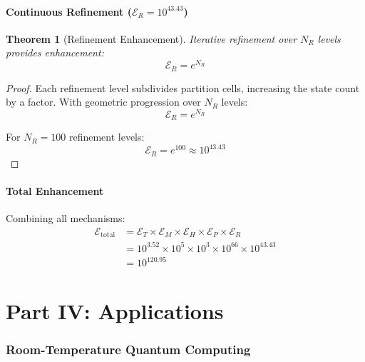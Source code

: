 \documentclass[twocolumn,10pt,twoside]{article}
\newtheorem{theorem}{Theorem}[section]
\newcommand{\Enh}{\mathcal{E}}
\begin{document}
\subsection{Continuous Refinement ($\Enh_R = 10^{43.43}$)}

\begin{theorem}[Refinement Enhancement]
\label{thm:refinement}
Iterative refinement over $N_R$ levels provides enhancement:
\begin{equation}
\Enh_R = e^{N_R}
\end{equation}
\end{theorem}

\begin{proof}
Each refinement level subdivides partition cells, increasing the state count by a factor. With geometric progression over $N_R$ levels:
\begin{equation}
\Enh_R = e^{N_R}
\end{equation}

For $N_R = 100$ refinement levels:
\begin{equation}
\Enh_R = e^{100} \approx 10^{43.43}
\end{equation}
\end{proof}

\subsection{Total Enhancement}

Combining all mechanisms:
\begin{align}
\Enh_{\text{total}} &= \Enh_T \times \Enh_M \times \Enh_H \times \Enh_P \times \Enh_R \\
&= 10^{3.52} \times 10^5 \times 10^3 \times 10^{66} \times 10^{43.43} \\
&= 10^{120.95}
\label{eq:total_enhancement_value}
\end{align}


\part*{Part IV: Applications}

\section{Room-Temperature Quantum Computing}
\end{document}
